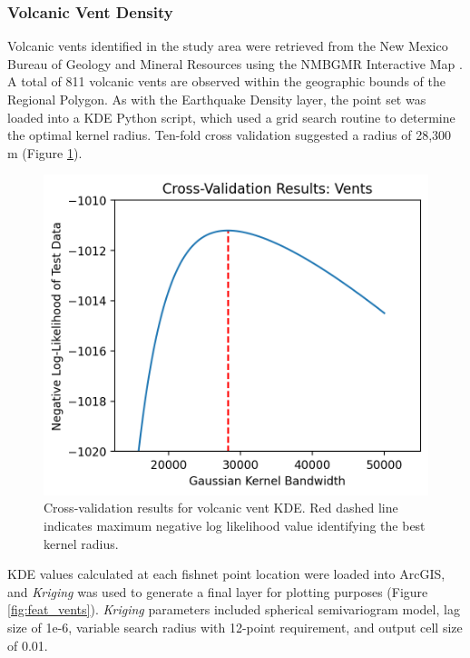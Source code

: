 \subsubsection{Volcanic Vent Density}

Volcanic vents identified in the study area were retrieved from the New Mexico Bureau of Geology and Mineral Resources using the NMBGMR Interactive Map \citep{nmbgmr_nmbgmr_2021}. A total of 811 volcanic vents are observed within the geographic bounds of the Regional Polygon. As with the Earthquake Density layer, the point set was loaded into a KDE Python script, which used a grid search routine to determine the optimal kernel radius. Ten-fold cross validation suggested a radius of 28,300 m (Figure \ref{fig:vent_cv}).

\begin{figure}[!htp]
\centering
\includegraphics[scale=.60]{templates/images/Figure-Vents_kde_gridsearchcv_result.png}
\caption[Volcanic vent density parameter tuning]{Cross-validation results for volcanic vent KDE. Red dashed line indicates maximum negative log likelihood value identifying the best kernel radius.}
\label{fig:vent_cv}
\end{figure}

KDE values calculated at each fishnet point location were loaded into ArcGIS, and \textit{Kriging} was used to generate a final layer for plotting purposes (Figure \ref{fig:feat_vents}). \textit{Kriging} parameters included spherical semivariogram model, lag size of 1e-6, variable search radius with 12-point requirement, and output cell size of 0.01. 

